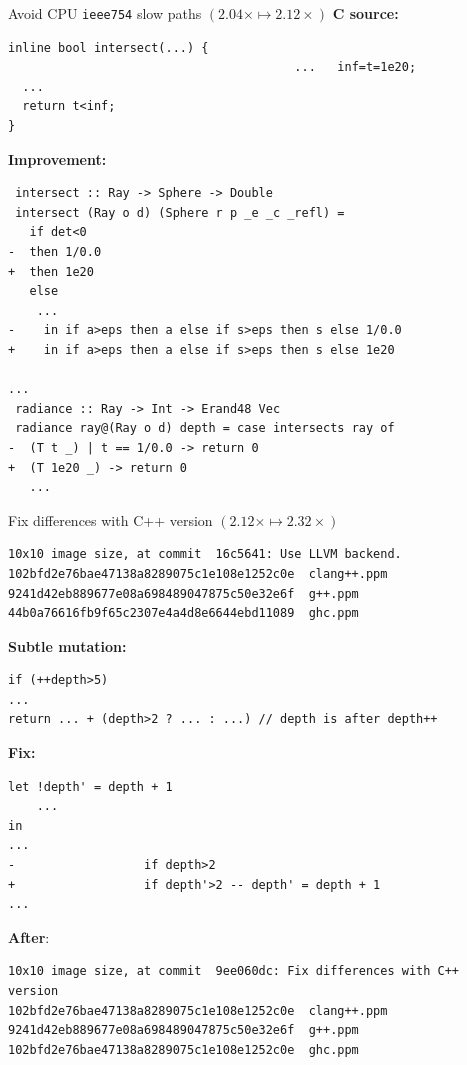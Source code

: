 \documentclass[8pt]{beamer}
\begin{document}
\begin{frame}[fragile]{Avoid CPU \texttt{ieee754} slow paths $(2.04\times \mapsto 2.12\times)$}
\textbf{C source:}
\begin{verbatim}
inline bool intersect(...) {
                                        ...   inf=t=1e20;
  ...                                                                   
  return t<inf;
}
\end{verbatim}

\textbf{Improvement:}
\begin{verbatim}
 intersect :: Ray -> Sphere -> Double
 intersect (Ray o d) (Sphere r p _e _c _refl) =
   if det<0
-  then 1/0.0
+  then 1e20
   else
    ...
-    in if a>eps then a else if s>eps then s else 1/0.0
+    in if a>eps then a else if s>eps then s else 1e20
 
...
 radiance :: Ray -> Int -> Erand48 Vec
 radiance ray@(Ray o d) depth = case intersects ray of
-  (T t _) | t == 1/0.0 -> return 0
+  (T 1e20 _) -> return 0
   ...
\end{verbatim}

\end{frame}


\begin{frame}[fragile]{Fix differences with C++ version $( 2.12\times \mapsto 2.32\times)$}

\begin{verbatim}
10x10 image size, at commit  16c5641: Use LLVM backend.
102bfd2e76bae47138a8289075c1e108e1252c0e  clang++.ppm
9241d42eb889677e08a698489047875c50e32e6f  g++.ppm
44b0a76616fb9f65c2307e4a4d8e6644ebd11089  ghc.ppm
\end{verbatim}
\pause

\textbf{Subtle mutation:}
\begin{verbatim}
if (++depth>5)
...
return ... + (depth>2 ? ... : ...) // depth is after depth++
\end{verbatim}
\pause
\textbf{Fix:}
\begin{verbatim}
let !depth' = depth + 1 
    ...
in
...
-                  if depth>2
+                  if depth'>2 -- depth' = depth + 1
...
\end{verbatim}
\pause
\textbf{After}:
\begin{verbatim}
10x10 image size, at commit  9ee060dc: Fix differences with C++ version
102bfd2e76bae47138a8289075c1e108e1252c0e  clang++.ppm
9241d42eb889677e08a698489047875c50e32e6f  g++.ppm
102bfd2e76bae47138a8289075c1e108e1252c0e  ghc.ppm
\end{verbatim}


\end{frame}
\end{document}
